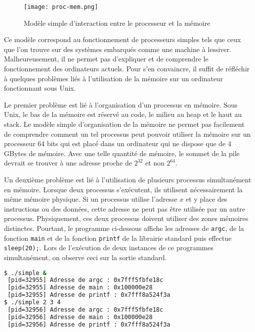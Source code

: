 \begin{figure}[!ht]
    \centering
    \texttt{[image: proc-mem.png]}
    \caption{Modèle simple d'interaction entre le processeur et la
    mémoire}
\end{figure}

Ce modèle correspond au fonctionnement de processeurs simples tels que
ceux que l'on trouve sur des systèmes embarqués comme une machine à
lessiver. Malheureusement, il ne permet pas d'expliquer et de
comprendre le fonctionnement des ordinateurs actuels. Pour s'en
convaincre, il suffit de réfléchir à quelques problèmes liés à
l'utilisation de la mémoire sur un ordinateur fonctionnant sous Unix.
\newline
 
Le premier problème est lié à l'organisation d'un processus en mémoire.
Sous Unix, le bas de la mémoire est réservé au code, le milieu au heap
et le haut au stack. Le modèle simple d'organisation de la mémoire ne
permet pas facilement de comprendre comment un tel processus peut
pouvoir utiliser la mémoire sur un processeur 64 bits qui est placé
dans un ordinateur qui ne dispose que de 4 GBytes de mémoire. Avec une
telle quantité de mémoire, le sommet de la pile devrait se trouver à
une adresse proche de $2^{32}$ et non $2^{64}$.
\newline
 
Un deuxième problème est lié à l'utilisation de plusieurs processus
simultanément en mémoire. Lorsque deux processus s'exécutent, ils
utilisent nécessairement la même mémoire physique. Si un processus
utilise l'adresse $x$ et y place des instructions ou des données,
cette adresse ne peut pas être utilisée par un autre processus.
Physiquement, ces deux processus doivent utiliser des zones mémoires
distinctes. Pourtant, le programme ci-dessous affiche les adresses de
\verb#argc#, de la fonction \verb#main# et de la fonction \verb#printf# de la
librairie standard puis effectue \verb#sleep(20);#. Lors de l'exécution de
deux instances de ce programmes simultanément, on observe ceci sur la
sortie standard. \newline

\begin{lstlisting}[language=bash]
$ ./simple &
 [pid=32955] Adresse de argc : 0x7fff5fbfe18c
 [pid=32955] Adresse de main : 0x100000e28
 [pid=32955] Adresse de printf : 0x7fff8a524f3a
$ ./simple 2 3 4
 [pid=32956] Adresse de argc : 0x7fff5fbfe18c
 [pid=32956] Adresse de main : 0x100000e28
 [pid=32956] Adresse de printf : 0x7fff8a524f3a
\end{lstlisting}
 
